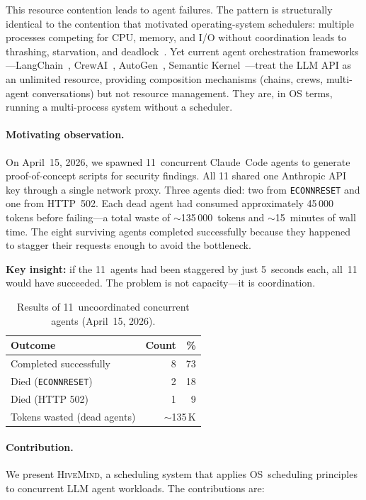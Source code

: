 \documentclass[11pt,twocolumn]{article}
\newcommand{\hm}{\textsc{HiveMind}}
\begin{document}
This resource contention leads to agent failures.  The pattern
is structurally identical to the contention that motivated
operating-system schedulers: multiple processes competing for
CPU, memory, and I/O without coordination leads to thrashing,
starvation, and deadlock~\cite{silberschatz2018os,coffman1971deadlocks}.
Yet current agent orchestration frameworks---LangChain~\cite{langchain2022},
CrewAI~\cite{crewai2024}, AutoGen~\cite{autogen2023}, Semantic
Kernel~\cite{semantickernel2023}---treat the LLM API as an
unlimited resource, providing composition mechanisms (chains,
crews, multi-agent conversations) but not resource management.
They are, in OS terms, running a multi-process system without
a scheduler.

\paragraph{Motivating observation.}
On April~15, 2026, we spawned 11~concurrent Claude~Code agents
to generate proof-of-concept scripts for security findings.  All
11 shared one Anthropic API key through a single network proxy.
Three agents died: two from \texttt{ECONNRESET} and one from
HTTP~502.  Each dead agent had consumed approximately 45\,000
tokens before failing---a total waste of ${\sim}$135\,000~tokens
and ${\sim}$15~minutes of wall time.  The eight surviving agents
completed successfully because they happened to stagger their
requests enough to avoid the bottleneck.

\textbf{Key insight:} if the 11~agents had been staggered by
just 5~seconds each, all~11 would have succeeded.  The problem
is not capacity---it is coordination.

\begin{table}[t]
\centering
\footnotesize
\caption{Results of 11~uncoordinated concurrent agents
(April~15, 2026).}
\label{tab:motivation}
\begin{tabular}{@{}lrr@{}}
\toprule
Outcome & Count & \% \\
\midrule
Completed successfully & 8 & 73 \\
Died (\texttt{ECONNRESET}) & 2 & 18 \\
Died (HTTP 502) & 1 & 9 \\
\midrule
Tokens wasted (dead agents) & \multicolumn{2}{r}{${\sim}$135\,K} \\
\bottomrule
\end{tabular}
\end{table}

\paragraph{Contribution.}
We present \hm{}, a scheduling system that applies OS~scheduling
principles to concurrent LLM agent workloads.  The contributions
are:
\end{document}
